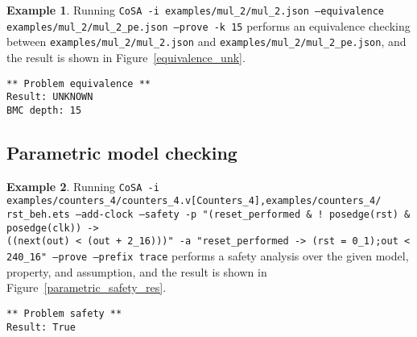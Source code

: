 \documentclass{article}
\theoremstyle{definition}
\newtheorem{example}{Example}[section]
\begin{document}
\begin{example}
  Running \texttt{CoSA -i examples/mul\_2/mul\_2.json --equivalence
    examples/mul\_2/mul\_2\_pe.json --prove -k 15} performs an
  equivalence checking between \texttt{examples/mul\_2/mul\_2.json}
  and \texttt{examples/mul\_2/mul\_2\_pe.json}, and the result is
  shown in Figure~\ref{equivalence_unk}.

\begin{lstlisting}[frame=single,language=ets,caption=Equivalence example (UNKNOWN),label=equivalence_unk]
** Problem equivalence **
Result: UNKNOWN
BMC depth: 15
\end{lstlisting}

\end{example}

\subsection{Parametric model checking}


\begin{example}
  Running \texttt{CoSA -i
    examples/counters\_4/counters\_4.v[Counters\_4],examples/counters\_4/
    rst\_beh.ets
    --add-clock --safety -p "(reset\_performed \& ! posedge(rst) \&
    posedge(clk)) -> \\((next(out) < (out + 2\_16)))" -a
    "reset\_performed -> (rst = 0\_1);out < 240\_16" --prove --prefix trace}
  performs a safety analysis over the given model, property, and
  assumption, and the result is shown in Figure~\ref{parametric_safety_res}.

\begin{lstlisting}[frame=single,language=ets,caption=Safety analysis example,label=parametric_safety_res]
** Problem safety **
Result: True
\end{lstlisting}

\end{example}
\end{document}
